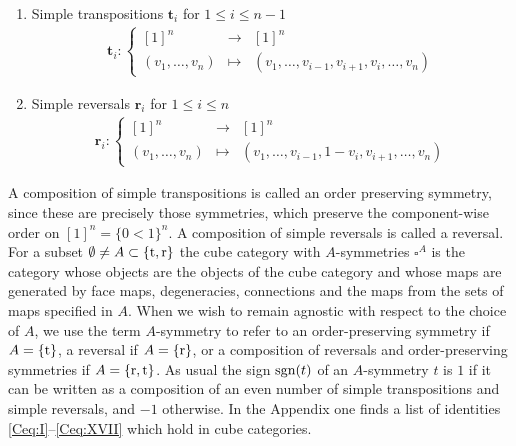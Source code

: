 \documentclass[12pt]{amsart}
\theoremstyle{plain}
\numberwithin{lemma}{\DefaultNumberTheoremWithin}
\numberwithin{claim}{\DefaultNumberTheoremWithin}
\numberwithin{theorem}{\DefaultNumberTheoremWithin}
\numberwithin{corollary}{\DefaultNumberTheoremWithin}
\numberwithin{proposition}{\DefaultNumberTheoremWithin}
\numberwithin{conjecture}{\DefaultNumberTheoremWithin}
\theoremstyle{definition}
\theoremstyle{definition}
\numberwithin{question}{\DefaultNumberTheoremWithin}
\theoremstyle{definition}
\numberwithin{problem}{\DefaultNumberTheoremWithin}
\theoremstyle{remark}
\numberwithin{remark}{\DefaultNumberTheoremWithin}
\theoremstyle{remark}
\numberwithin{example}{\DefaultNumberTheoremWithin}
\def\one{[1]}
\def \la{\longrightarrow}
\def \lm{\longmapsto}
\def\sgn{\textnormal{sgn}}
\def\rev{\textnormal{r}}
\def\trp{\textnormal{t}}
\def\bt{\boldsymbol t}
\def\br{\boldsymbol r}
\newcommand{\firstappearence}[1]{{\sf #1}}
\begin{document}
 \begin{enumerate}
    \item[(trp)] Simple transpositions $\bt_i$ for $1\leq i \leq n-1$ 
    \begin{align*}
        \bt_i\colon \left\{ \begin{array}{ccc} \one^n&\la& \one^n  \\
        (v_1,\ldots, v_{n})&\lm &(v_1,\ldots, v_{i-1},v_{i+1},v_{i},\ldots ,v_{n})\end{array} \right.
    \end{align*}
    \item[(rev)] Simple reversals $\br_i$ for $1\leq i \leq n$
    \begin{align*}
        \br_i\colon \left\{ \begin{array}{ccc} \one^n & \la & \one^n\\
        (v_1,\ldots, v_{n})&\lm & (v_1,\ldots ,v_{i-1},1-v_{i},v_{i+1},\ldots, v_{n}) \end{array} \right.
    \end{align*}
\end{enumerate}

 A composition of simple transpositions is called an order preserving symmetry, since these are precisely those symmetries, which preserve the component-wise order on $[1]^n=\{0<1\}^n$. A composition of simple reversals is called a reversal. For a subset $\emptyset \neq A\subset \{\trp,\rev\}$ the cube category with $A$-symmetries $\square^A$ is the category whose objects are the
objects of the cube category and whose maps are generated by face maps, degeneracies, connections and the maps from the sets of maps specified in
$A$. When we wish to remain agnostic with respect to the choice of $A$, we use the term $A$\firstappearence{-symmetry} to refer to an order-preserving symmetry if $A=\{\trp\}$, a reversal if $A=\{\rev\}$, or a composition of reversals and order-preserving symmetries if $A=\{\rev,\trp\}$. As usual the \firstappearence{sign} $\sgn(t)$ of an $A$-symmetry $t$ is $1$ if it can be written as a composition of an even number of simple transpositions and simple reversals, and $-1$ otherwise.
 In the Appendix one finds a list of identities \ref{Ceq:I}--\ref{Ceq:XVII} which hold in cube categories.
\end{document}
